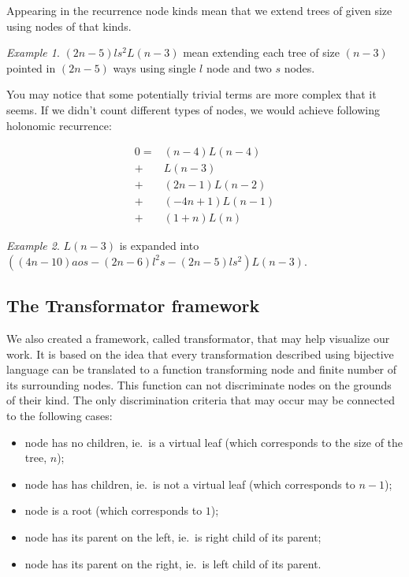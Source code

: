 \documentclass[final]{article}
\theoremstyle{definition}
\theoremstyle{remark}
\newtheorem{example}{Example}[subsection]
\begin{document}
Appearing in the recurrence node kinds mean that we extend trees of given size using nodes of that kinds.

\begin{example}
    \((2n - 5) l s^2 L(n - 3)\) mean extending each tree of size \((n - 3)\) pointed in \((2n - 5)\) ways using single \(l\) node and two \(s\) nodes.
\end{example}

You may notice that some potentially trivial terms are more complex that it seems. If we didn't count different types of nodes, we would achieve following holonomic recurrence:

\[\begin{array}{rl}
        0 =& (n - 4) L(n - 4)\\
        +& L(n - 3)\\
        +& (2 n - 1) L(n - 2)\\
        +& (-4 n + 1) L(n - 1)\\
        +& (1 + n) L(n)
\end{array}\]

\begin{example}
    \(L(n-3)\) is expanded into \(((4 n - 10) a o s - (2 n - 6) l^2 s - (2 n - 5) l s^2) L(n - 3)\).
\end{example}


\subsection{The Transformator framework}%
\label{sub:the_framework}

We also created a framework\cite{transformator}, called transformator, that may help visualize our work. It is based on the idea that every transformation described using bijective language can be translated to a function transforming node and finite number of its surrounding nodes. This function can not discriminate nodes on the grounds of their kind. The only discrimination criteria that may occur may be connected to the following cases:
\begin{itemize}
    \item node has no children, ie.~is a virtual leaf (which corresponds to the size of the tree, \(n\));
    \item node has has children, ie.~is not a virtual leaf (which corresponds to \(n - 1\));
    \item node is a root (which corresponds to \(1\));
    \item node has its parent on the left, ie.~is right child of its parent;
    \item node has its parent on the right, ie.~is left child of its parent.
\end{itemize}
\end{document}
